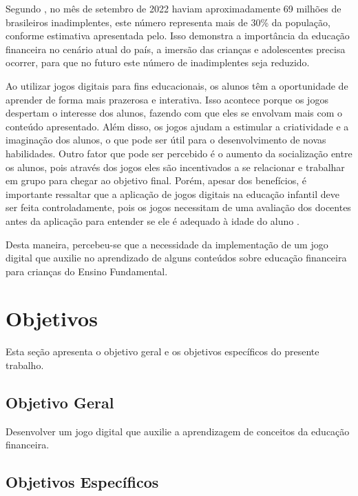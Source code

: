 Segundo , no mês de setembro de 2022 haviam aproximadamente 69 milhões de brasileiros
inadimplentes, este número representa mais de 30\% da população, conforme estimativa apresentada
pelo\cite{IBGE_populacao}. Isso demonstra a importância da educação financeira no cenário atual do país, a imersão
das crianças e adolescentes precisa ocorrer, para que no futuro este número de inadimplentes seja reduzido.

Ao utilizar jogos digitais para fins educacionais, os alunos têm a oportunidade de aprender de forma mais prazerosa
e interativa. Isso acontece porque os jogos despertam o interesse dos alunos, fazendo com que eles se envolvam mais
com o conteúdo apresentado. Além disso, os jogos ajudam a estimular a criatividade e a imaginação dos alunos, o que
pode ser útil para o  desenvolvimento de novas habilidades. Outro fator que pode ser percebido é o aumento da
socialização entre os alunos, pois através dos jogos eles são incentivados a se relacionar e trabalhar em grupo para
chegar ao objetivo final. Porém, apesar dos benefícios, é importante ressaltar que a aplicação de jogos digitais na
educação infantil deve ser feita controladamente, pois os jogos necessitam de uma avaliação dos docentes antes da
aplicação para entender se ele é adequado à idade do aluno \cite{Cruz_Araujo_Andrye_Galvao_Madeira_2022}.

Desta maneira, percebeu-se que a necessidade da implementação de um jogo digital que auxilie no aprendizado de alguns
conteúdos sobre educação financeira para crianças do Ensino Fundamental.

\section{Objetivos}

Esta seção apresenta o objetivo geral e os objetivos específicos do presente trabalho.

\subsection{Objetivo Geral}

Desenvolver um jogo digital que auxilie a aprendizagem de conceitos da educação financeira.

\subsection{Objetivos Específicos}

